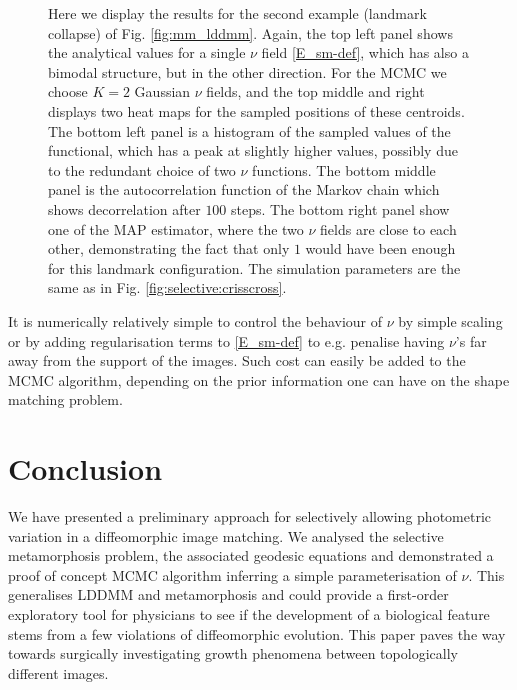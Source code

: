 \documentclass[runningheads]{llncs}
\begin{document}
\begin{figure}[h!]
    \caption{ Here we display the results for the second example (landmark
      collapse) of Fig. \ref{fig:mm_lddmm}.  
      Again, the top left panel shows the analytical values for a single $\nu$ field
    \eqref{E_sm-def}, which has also a bimodal structure, but in the other direction. 
    For the MCMC we choose $K=2$ Gaussian $\nu$ fields, and the top middle and right displays
    two heat maps for the sampled positions of these centroids. 
    The bottom left
    panel is a histogram of the sampled values of the functional, which has a peak at 
    slightly higher values, possibly due to the redundant choice of two $\nu$ functions.
    The bottom
    middle panel is the autocorrelation function of the Markov chain which shows decorrelation
    after $100$ steps. 
    The bottom right panel show one of the MAP estimator, where the two $\nu$  fields are close to 
  each other, demonstrating the fact that only $1$ would have been enough for this landmark configuration.
  The simulation parameters are the same as in Fig. \ref{fig:selective:crisscross}.
}
    \label{fig:selective:pinch}
\end{figure}

It is numerically relatively simple to control the behaviour of $\nu$ by simple
scaling or by adding regularisation terms to \eqref{E_sm-def} to e.g. penalise
having $\nu$'s far away from the support of the images. 
Such cost can easily be added to the MCMC algorithm, depending on the prior
information one can have on the shape matching problem.

\section{Conclusion}\label{sec:outlook}

We have presented a preliminary approach for selectively allowing photometric
variation in a diffeomorphic image matching. We analysed the selective
metamorphosis problem, the associated geodesic equations and demonstrated a
proof of concept MCMC algorithm inferring a simple parameterisation of $\nu$.
This generalises LDDMM and metamorphosis and could provide a first-order
exploratory tool for physicians to see if the development of a biological
feature stems from a few violations of diffeomorphic evolution. This paper paves
the way towards surgically investigating growth phenomena between topologically
different images.
\end{document}

